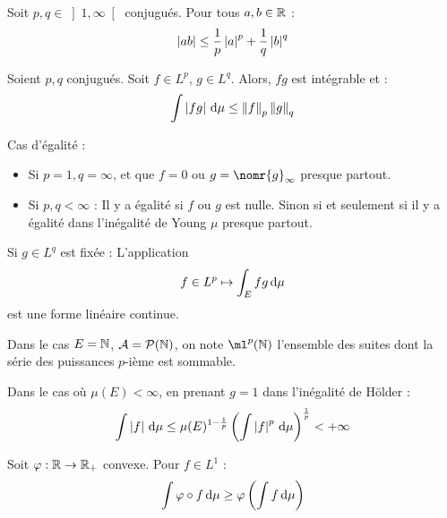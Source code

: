 \documentclass{cours}
\begin{document}
        \begin{lemma}
            Soit $p, q \in \left]1, \infty\right[$ conjugués. Pour tous $a, b \in \mathbb{R}$ : 
            \[
                \left|ab\right| \leq \frac{1}{p}\left|a\right|^{p} + \frac{1}{q}\left|b\right|^{q}
            \]  
        \end{lemma}
        \begin{proposition}
            Soient $p, q$ conjugués. Soit $f \in L^{p}$, $g \in L^{q}$. Alors, $fg$ est intégrable et : 
            \[  
                \int \left|fg\right| {\rm \, d} \mu \leq \left\lVert f \right\rVert_{p}\left\lVert g \right\rVert_{q}
            \]
        \end{proposition}
        \begin{remark}
            Cas d'égalité : 
            \begin{itemize}
                \item Si $p = 1, q = \infty$, et que $f = 0$ ou $g = \nomr{g}_{\infty}$ presque partout.
                \item Si $p, q < \infty$ : Il y a égalité si $f$ ou $g$ est nulle. Sinon si et seulement si il y a égalité dans l'inégalité de Young $\mu$ presque partout. 
            \end{itemize}
        \end{remark}
        \begin{remark}
            Si $g \in L^{q}$ est fixée : L'application 
            \[
                f \in L^{p} \mapsto \int_{E}fg {\rm \, d} \mu    
            \]
            est une forme linéaire continue. 
        \end{remark}
        \begin{remark}
            Dans le cas $E = \mathbb{N}$, $\mathcal{A} = \mathcal{P}(\mathbb{N})$, on note $\ml^{p}(\N)$ l'ensemble des suites dont la série des puissances $p$-ième est sommable.
        \end{remark}

        \begin{remark}
            Dans le cas où $\mu(E)< \infty$, en prenant $g = 1$ dans l'inégalité de Hölder : 
            \[
                \int \left|f\right| {\rm \, d} \mu \leq \mu(E)^{1 - \frac{1}{p}} \left(\int \left|f\right|^{p} {\rm \, d}\mu\right)^{\frac{1}{p}} < + \infty
            \]
        \end{remark}

        \begin{proposition}
            Soit $\varphi : \mathbb{R} \rightarrow \mathbb{R}_{+}$ convexe. Pour $f \in L^{1}$ :
            \[
                \int \varphi \circ f {\rm \, d}\mu \geq \varphi \left(\int f {\rm \, d}\mu\right)    
            \]
        \end{proposition}
\end{document}
